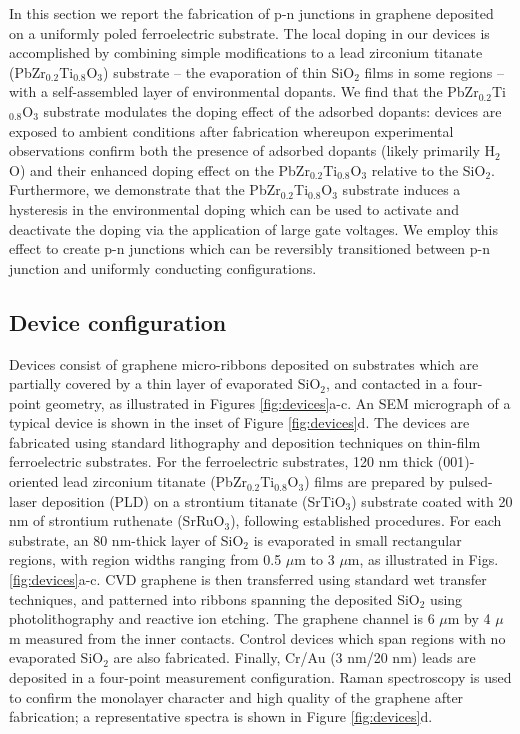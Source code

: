\documentclass[edeposit,fullpage,draftthesis]{uiucthesis2009}
\begin{document}
        In this section we report the fabrication of p-n junctions in graphene deposited on a uniformly poled ferroelectric substrate. The local doping in our devices is accomplished by combining simple modifications to a lead zirconium titanate (PbZr$_{0.2}$Ti$_{0.8}$O$_3$) substrate -- the evaporation of thin SiO$_2$ films in some regions -- with a self-assembled layer of environmental dopants. We find that the PbZr$_{0.2}$Ti$_{0.8}$O$_3$ substrate modulates the doping effect of the adsorbed dopants: devices are exposed to ambient conditions after fabrication whereupon experimental observations confirm both the presence of adsorbed dopants (likely primarily H$_2$O) and their enhanced doping effect on the PbZr$_{0.2}$Ti$_{0.8}$O$_3$ relative to the SiO$_2$.
        Furthermore, we demonstrate that the PbZr$_{0.2}$Ti$_{0.8}$O$_3$ substrate induces a hysteresis in the environmental doping which can be used to activate and deactivate the doping via the application of large gate voltages. We employ this effect to create p-n junctions which can be reversibly transitioned between p-n junction and uniformly conducting configurations.

    \subsection{Device configuration}
    
        Devices consist of graphene micro-ribbons deposited on substrates which are partially covered by a thin layer of evaporated SiO$_2$, and contacted in a four-point geometry, as illustrated in Figures \ref{fig:devices}a-c. An SEM micrograph of a typical device is shown in the inset of Figure \ref{fig:devices}d. The devices are fabricated using standard lithography and deposition techniques on thin-film ferroelectric substrates. For the ferroelectric substrates, 120 nm thick (001)-oriented lead zirconium titanate (PbZr$_{0.2}$Ti$_{0.8}$O$_3$) films are prepared by pulsed-laser deposition (PLD) on a strontium titanate (SrTiO$_3$) substrate coated with 20 nm of strontium ruthenate (SrRuO$_3$), following established procedures\cite{Xu2014,Karthik2012}. For each substrate, an 80 nm-thick layer of SiO$_2$ is evaporated in small rectangular regions, with region widths ranging from 0.5 $\mu$m to 3 $\mu$m, as illustrated in Figs. \ref{fig:devices}a-c. CVD graphene is then transferred using standard wet transfer techniques\cite{Li2009}, and patterned into ribbons spanning the deposited SiO$_2$ using photolithography and reactive ion etching. The graphene channel is 6 $\mu$m by 4 $\mu$m measured from the inner contacts. Control devices which span regions with no evaporated SiO$_2$ are also fabricated. Finally, Cr/Au (3 nm/20 nm) leads are deposited in a four-point measurement configuration.  Raman spectroscopy is used to confirm the monolayer character and high quality of the graphene after fabrication; a representative spectra is shown in Figure \ref{fig:devices}d.
\end{document}

